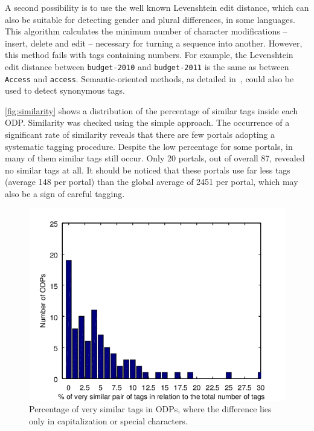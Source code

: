 A second possibility is to use the well known Levenshtein edit distance, which can also be suitable for detecting gender and plural differences, in some languages. 
This algorithm calculates the minimum number of character modifications -- insert, delete and edit -- necessary for turning a sequence into another. 
However, this method fails with tags containing numbers. 
For example, the Levenshtein edit distance between \texttt{budget-2010} and \texttt{budget-2011} is the same as between \texttt{Access} and \texttt{access}.
Semantic-oriented methods, as detailed in~, could also be used to detect synonymous tags.

\autoref{fig:similarity} shows a distribution of the percentage of similar tags inside each ODP.
Similarity was checked using the simple approach.
The occurrence of a significant rate of similarity reveals that there are few portals adopting a systematic tagging procedure.
Despite the low percentage for some portals, in many of them similar tags still occur.
Only 20 portals, out of overall 87, revealed no similar tags at all. 
It should be noticed that these portals use far less tags (average 148 per portal) than the global average of 2451 per portal, which may also be a sign of careful tagging.

\begin{figure}[tb]
\begin{center}
\includegraphics[scale=1.2]{images/similarity.png}
\caption[Percentage of very similar tags in ODPs.]{Percentage of very similar tags in ODPs, where the difference lies only in capitalization or special characters.}
\label{fig:similarity}
\end{center}
\end{figure}


